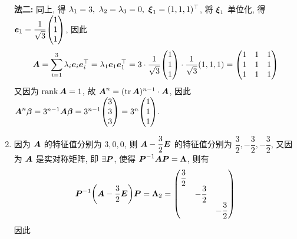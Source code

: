 \begin{solution}
\begin{enumerate}[label=(\arabic{*})]
              \textbf{法二: }同上, 得 $\lambda_1=3,~\lambda_2=\lambda_3=0,~\vb*{\xi}_1=(1,1,1)^\top$, 将 $\vb*{\xi}_1$ 单位化, 得 $\vb*{e}_1=\dfrac{1}{\sqrt{3}}\mqty(1\\1\\1)$, 因此
              $$\vb*{A}=\sum_{i=1}^{3}\lambda_i\vb*{e}_i\vb*{e}_i^\top=\lambda_1\vb*{e}_1\vb*{e}_1^\top=3\cdot\dfrac{1}{\sqrt{3}}\mqty(1\\1\\1)\cdot\dfrac{1}{\sqrt{3}}(1,1,1)=\mqty(1&1&1\\1&1&1\\1&1&1)$$
              又因为 $\rank\vb*{A}=1$, 故 $\vb*{A}^n=(\tr\vb*{A})^{n-1}\cdot\vb*{A}$, 因此 $\vb*{A}^n\vb*{\beta}=3^{n-1}\vb*{A\beta}=3^{n-1}\mqty(3\\3\\3)=3^{n}\mqty(1\\1\\1).$
        \item 因为 $\vb*{A}$ 的特征值分别为 $3,0,0$, 则 $\vb*{A}-\dfrac{3}{2}\vb*{E}$ 的特征值分别为 $\dfrac{3}{2},-\dfrac{3}{2},-\dfrac{3}{2}$, 又因为 $\vb*{A}$ 是实对称矩阵, 即 $\exists\vb*{P}$, 使得 $\vb*{P}^{-1}\vb*{AP}=\vb*{\Lambda}$, 则有
              $$\vb*{P}^{-1}\qty(\vb*{A}-\dfrac{3}{2}\vb*{E})\vb*{P}=\vb*{\Lambda}_2=\mqty(\dfrac{3}{2}\\&-\dfrac{3}{2}\\&&-\dfrac{3}{2})$$ 因此
    \end{enumerate}
\end{solution}

